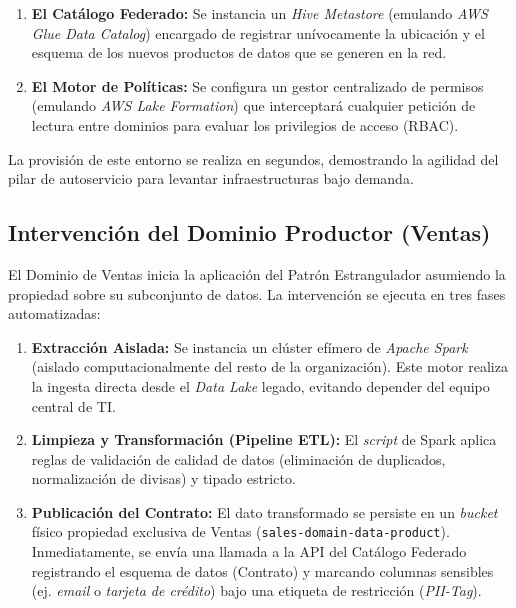 \documentclass[12pt, a4paper]{article}
\begin{document}
\begin{enumerate}
    \item \textbf{El Catálogo Federado:} Se instancia un \textit{Hive Metastore} (emulando \textit{AWS Glue Data Catalog}) encargado de registrar unívocamente la ubicación y el esquema de los nuevos productos de datos que se generen en la red.
    \item \textbf{El Motor de Políticas:} Se configura un gestor centralizado de permisos (emulando \textit{AWS Lake Formation}) que interceptará cualquier petición de lectura entre dominios para evaluar los privilegios de acceso (RBAC).
\end{enumerate}

La provisión de este entorno se realiza en segundos, demostrando la agilidad del pilar de autoservicio para levantar infraestructuras bajo demanda.

\subsection{Intervención del Dominio Productor (Ventas)}

El Dominio de Ventas inicia la aplicación del Patrón Estrangulador asumiendo la propiedad sobre su subconjunto de datos. La intervención se ejecuta en tres fases automatizadas:

\begin{enumerate}
    \item \textbf{Extracción Aislada:} Se instancia un clúster efímero de \textit{Apache Spark} (aislado computacionalmente del resto de la organización). Este motor realiza la ingesta directa desde el \textit{Data Lake} legado, evitando depender del equipo central de TI.
    \item \textbf{Limpieza y Transformación (Pipeline ETL):} El \textit{script} de Spark aplica reglas de validación de calidad de datos (eliminación de duplicados, normalización de divisas) y tipado estricto.
    \item \textbf{Publicación del Contrato:} El dato transformado se persiste en un \textit{bucket} físico propiedad exclusiva de Ventas (\texttt{sales-domain-data-product}). Inmediatamente, se envía una llamada a la API del Catálogo Federado registrando el esquema de datos (Contrato) y marcando columnas sensibles (ej. \textit{email} o \textit{tarjeta de crédito}) bajo una etiqueta de restricción (\textit{PII-Tag}).
\end{enumerate}
\end{document}
